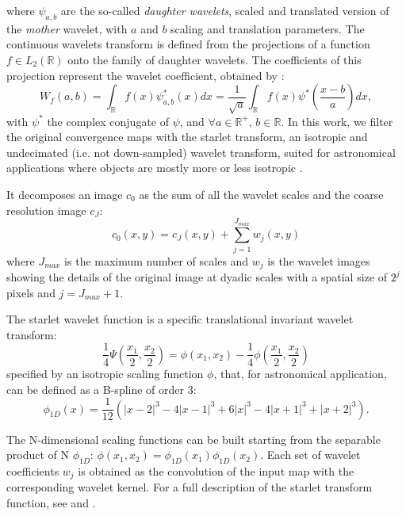 \documentclass{aa}
\begin{document}
where $\psi_{a,b}$ are the so-called \textit{daughter wavelets}, scaled and translated version of the \textit{mother} wavelet, with $a$ and $b$ scaling and translation parameters.
The continuous wavelets transform is defined from the projections of a function $f \in L_2(\mathbb{R})$ onto the family of daughter wavelets. The coefficients of this projection represent the wavelet coefficient, obtained by :
\begin{equation}
    W_f(a,b)=\int_{\mathbb{R}} f(x)\psi^{*}_{a,b}(x)dx=\frac{1}{\sqrt{a}}\int_{\mathbb{R}}f(x)\psi^{*}\left( \frac{x-b}{a}\right)dx ,
\end{equation}
with $\psi^{*}$ the complex conjugate of $\psi$, and $ \forall a \in \mathbb{R}^{+}$, $ b \in \mathbb{R.}$  
In this work, we filter the original convergence maps with the starlet transform, an isotropic and undecimated (i.e. not down-sampled)  wavelet transform, suited for astronomical applications where objects are mostly more or less isotropic \citep{4060954}.

It decomposes an image $c_0$ as the sum of all the wavelet scales and the coarse resolution image $c_J$:
\begin{equation}\label{wav_des}
    c_0(x,y)=c_J(x,y)+\sum_{j=1}^{J_{max}} w_j(x,y)
\end{equation}
where $J_{max}$ is the maximum number of scales and $w_j$ is the wavelet images showing the details of the original image at dyadic scales with a spatial size of $2^j$ pixels and $j = J_{max} + 1$. 

The starlet wavelet function is a specific translational invariant wavelet transform:
\begin{equation}
   \frac{1}{4} \Psi \left ( \frac{x_1}{2}, \frac{x_2}{2} \right )=
    \phi (x_1,x_2)- \frac{1}{4} \phi  \left ( \frac{x_1}{2},  \frac{x_2}{2} \right )
\end{equation}
specified by an isotropic scaling function $\phi$, that,  for astronomical application, can be defined as a B-spline of order 3:
\begin{equation}
\phi_{1D}(x)= \frac{1}{12} (|x-2|^3-4|x-1|^3+6|x|^3-4|x+1|^3+|x+2|^3 ).
\end{equation}

The N-dimensional scaling functions can be built starting from the separable product of N $\phi_{1D}$: $\phi(x_1,x_2)=\phi_{1D}(x_1)\phi_{1D}(x_2)$. 
Each set of wavelet coefficients $w_j$ is obtained as the convolution of the input map with the corresponding wavelet kernel. For a full description of the starlet transform function, see \citet{4060954} and \citet{10.5555/1830428}.
\end{document}
